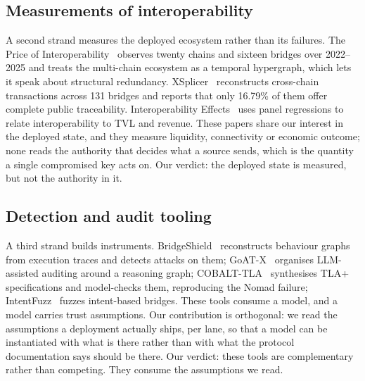 \documentclass[10pt,a4paper]{article}
\begin{document}
\subsection{Measurements of interoperability}
A second strand measures the deployed ecosystem rather than its failures. The Price of
Interoperability~\cite{priceinterop2026} observes twenty chains and sixteen bridges over 2022--2025 and
treats the multi-chain ecosystem as a temporal hypergraph, which lets it speak about structural redundancy.
XSplicer~\cite{xsplicer2026} reconstructs cross-chain transactions across 131 bridges and reports that only
16.79\% of them offer complete public traceability. Interoperability Effects~\cite{interop2026} uses panel
regressions to relate interoperability to TVL and revenue. These papers share our interest in the deployed
state, and they measure liquidity, connectivity or economic outcome; none reads the authority that decides
what a source sends, which is the quantity a single compromised key acts on. Our verdict: the deployed state is measured, but not the authority in it.

\subsection{Detection and audit tooling}
A third strand builds instruments. BridgeShield~\cite{bridgeshield2025} reconstructs behaviour graphs from
execution traces and detects attacks on them; GoAT-X~\cite{goatx2026} organises LLM-assisted auditing around
a reasoning graph; COBALT-TLA~\cite{cobalttla2026} synthesises TLA+ specifications and model-checks them,
reproducing the Nomad failure; IntentFuzz~\cite{intentfuzz2026} fuzzes intent-based bridges. These tools
consume a model, and a model carries trust assumptions. Our contribution is orthogonal: we read the
assumptions a deployment actually ships, per lane, so that a model can be instantiated with what is there
rather than with what the protocol documentation says should be there. Our verdict: these tools are complementary rather than competing. They consume the assumptions we read.
\end{document}
